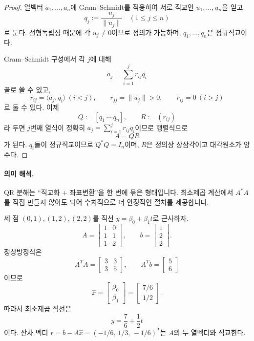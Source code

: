 \begin{proof}
열벡터 $a_1,\dots,a_n$에 Gram--Schmidt를 적용하여 서로 직교인 $u_1,\dots,u_n$을 얻고
$$
q_j:=\frac{u_j}{\|u_j\|}\quad(1\le j\le n)
$$
로 둔다. 선형독립성 때문에 각 $u_j\ne0$이므로 정의가 가능하며, $q_1,\dots,q_n$은 정규직교이다.

Gram--Schmidt 구성에서 각 $j$에 대해
$$
a_j=\sum_{i=1}^j r_{ij}q_i
$$
꼴로 쓸 수 있고,
$$
r_{ij}=\langle a_j,q_i\rangle\ (i<j),\qquad r_{jj}=\|u_j\|>0,\qquad r_{ij}=0\ (i>j)
$$
로 둘 수 있다. 이제
$$
Q:=[q_1\ \cdots\ q_n],\qquad R:=(r_{ij})
$$
라 두면 $j$번째 열식이 정확히 $a_j=\sum_{i=1}^j r_{ij}q_i$이므로 행렬식으로
$$
A=QR
$$
가 된다. $q_i$들이 정규직교이므로 $Q^*Q=I_n$이며, $R$은 정의상 상삼각이고 대각원소가 양수다.
\end{proof}

\paragraph{의미 해석.}
QR 분해는 ``직교화 + 좌표변환''을 한 번에 묶은 형태입니다. 최소제곱 계산에서 $A^*A$를 직접 만들지 않아도 되어 수치적으로 더 안정적인 절차를 제공합니다.

\begin{example}
세 점 $(0,1),(1,2),(2,2)$를 직선 $y=\beta_0+\beta_1 t$로 근사하자. 
$$
A=
\begin{bmatrix}
1&0\\
1&1\\
1&2
\end{bmatrix},\qquad
b=
\begin{bmatrix}
1\\2\\2
\end{bmatrix}.
$$
정상방정식은
$$
A^TA=
\begin{bmatrix}
3&3\\
3&5
\end{bmatrix},\qquad
A^Tb=
\begin{bmatrix}
5\\6
\end{bmatrix}
$$
이므로
$$
\hat x=
\begin{bmatrix}
\beta_0\\\beta_1
\end{bmatrix}
=
\begin{bmatrix}
7/6\\1/2
\end{bmatrix}.
$$
따라서 최소제곱 직선은
$$
y=\frac76+\frac12 t
$$
이다. 잔차 벡터 $r=b-A\hat x=(-1/6,\,1/3,\,-1/6)^T$는 $A$의 두 열벡터와 직교한다.
\end{example}

